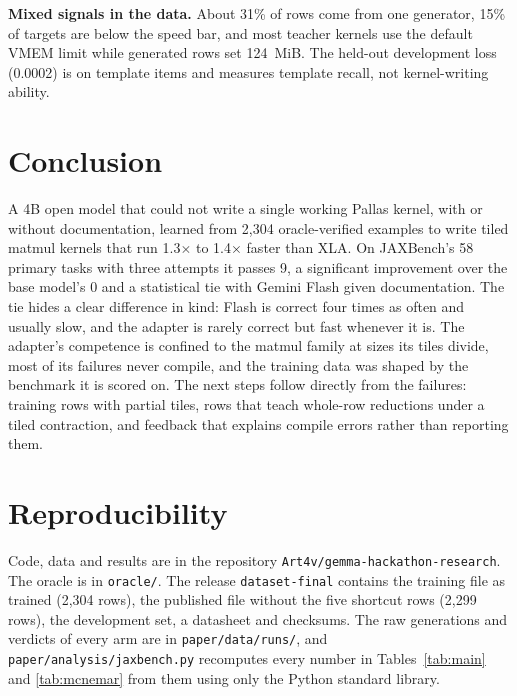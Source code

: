 \documentclass[conference]{IEEEtran}
\newcommand{\x}{$\times$}
\begin{document}
\textbf{Mixed signals in the data.} About 31\% of rows come from one generator, 15\% of targets are below the speed bar, and
most teacher kernels use the default VMEM limit while generated rows set 124~MiB. The held-out development loss (0.0002) is on
template items and measures template recall, not kernel-writing ability.

\section{Conclusion}

A 4B open model that could not write a single working Pallas kernel, with or without documentation, learned from 2,304
oracle-verified examples to write tiled matmul kernels that run 1.3\x{} to 1.4\x{} faster than XLA. On JAXBench's 58 primary
tasks with three attempts it passes 9, a significant improvement over the base model's 0 and a statistical tie with Gemini
Flash given documentation. The tie hides a clear difference in kind: Flash is correct four times as often and usually slow,
and the adapter is rarely correct but fast whenever it is. The adapter's competence is confined to the matmul family at
sizes its tiles divide, most of its failures never compile, and the training data was shaped by the benchmark it is scored
on. The next steps follow directly from the failures: training rows with partial tiles, rows that teach whole-row reductions
under a tiled contraction, and feedback that explains compile errors rather than reporting them.

\section*{Reproducibility}

Code, data and results are in the repository \texttt{Art4v/gemma-hackathon-research}. The oracle is in \texttt{oracle/}. The
release \texttt{dataset-final} contains the training file as trained (2,304 rows), the published file without the five
shortcut rows (2,299 rows), the development set, a datasheet \cite{datasheets} and checksums. The raw generations and verdicts of every arm are
in \texttt{paper/data/runs/}, and \texttt{paper/analysis/jaxbench.py} recomputes every number in Tables~\ref{tab:main} and
\ref{tab:mcnemar} from them using only the Python standard library.
\end{document}
